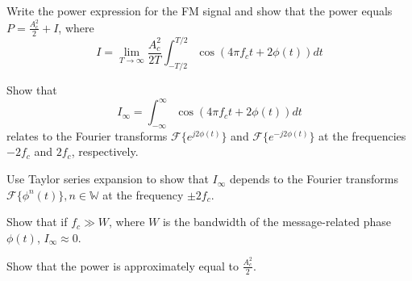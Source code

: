 \documentclass[fleqn]{article}
\begin{document}
\begin{question}

\begin{subquestion}{Write the power expression for the FM
signal and show that the power equals $P=\frac{A_c^2}{2}+I
$, where
$$
I=\lim_{T\rightarrow \infty} \frac{A_c^2}{2T}\int_{-T/2}^{T/2} \cos(4\pi f_c t +2\phi(t))dt
$$
} 
\answer{
\[P = \lim_{T\rightarrow \infty} \frac{1}{T} \int_{-T/2}^{T/2} u^2 (t) dt = \frac{1}{T} \int_{-T/2}^{T/2} A_c^2 \cos^2 (2\pi f_c t + \phi(t)) dt \]
\[= \frac{A_c^2}{2} +  \lim_{T\rightarrow \infty} \frac{A_c^2}{2T}\int_{-T/2}^{T/2} \cos(4\pi f_c t +2\phi(t))dt = \frac{A_c^2}{2}+I \]
\[\rightarrow \boxed{I=\lim_{T\rightarrow \infty} \frac{A_c^2}{2T}\int_{-T/2}^{T/2} \cos(4\pi f_c t +2\phi(t))dt} \]
}
\end{subquestion}
\begin{subquestion}{
Show that 
$$
I_{\infty}=\int_{-\infty}^\infty \cos(4\pi f_c t +2\phi(t))dt
$$
relates to the Fourier transforms $\mathcal{F}\{e^{j2\phi(t)}\}$ and $\mathcal{F}\{e^{-j2\phi(t)}\}$ at the frequencies $-2f_c$ and $2f_c$, respectively. 
}
\answer{
\[I_{\infty}=\int_{-\infty}^\infty \cos(4\pi f_c t +2\phi(t))dt = \int_{-\infty}^\infty \frac{1}{2}(e^{(j 4\pi f_c t +2\phi(t))} + e^{(-j 4\pi f_c t +2\phi(t))}) dt\]
\[ = \int_{-\infty}^\infty \frac{1}{2} (e^{4\pi f_c t} \times e^{2j \phi(t)}) + \int_{-\infty}^\infty \frac{1}{2} (e^{-4\pi f_c t} \times e^{-2j \phi(t)})\]
\[=\boxed{ \frac{1}{2} \mathcal{F}\{e^{j2\phi(t)}\}|_{f=-2f_c} + \frac{1}{2} \mathcal{F}\{e^{-j2\phi(t)}\}|_{f=2f_c}}\]

}
\end{subquestion}
\begin{subquestion}{Use Taylor series expansion to show that $I_{\infty}$ depends to the Fourier transforms $\mathcal{F}\{\phi^n(t)\}, n \in \mathbb{W}$ at the frequency $\pm 2f_c$.
}
\answer{
\[I_{\infty} = \frac{1}{2} \mathcal{F}\{1 + 2j\phi(t) + \frac{(2j\phi(t))^2}{2!} +
\frac{(2j\phi(t))^3}{3!} + ... \}|_{f=-2f_c} \]
\[+ \frac{1}{2} \mathcal{F}\{1 - 2j\phi(t) + \frac{(2j\phi(t))^2}{2!} -
\frac{(2j\phi(t))^3}{3!} + ... \}|_{f=2f_c} \]
\[= \boxed{\frac{1}{2} \sum_{n=0}^{\infty} \frac{(2j)^n}{n!} \mathcal{F}\{ \phi^n (t) \}|_{f=-2f_c} + \frac{1}{2} \sum_{n=0}^{\infty} \frac{(-2j)^n}{n!} \mathcal{F}\{ \phi^n (t) \}|_{f=2f_c}}\]
}
\end{subquestion}
\begin{subquestion}{Show that if $f_c\gg W$, where $W$ is the bandwidth of the message-related phase $\phi(t)$, $I_{\infty}\approx 0$. 
}
\answer{

}
\end{subquestion}
\begin{subquestion}{Show that the power is approximately equal to $\frac{A_c^2}{2}$. 
}
\answer{}
\end{subquestion}
\end{question}
\end{document}
